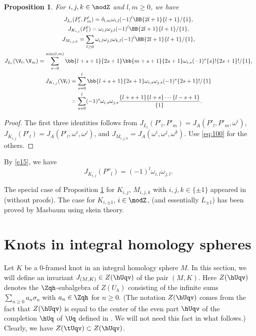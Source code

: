 \documentclass{amsart}
\numberwithin{equation}{section}
\numberwithin{figure}{section}
\theoremstyle{plain}
\newtheorem{proposition}[theorem]{Proposition}
\theoremstyle{definition}
\theoremstyle{remark}
\begin{document}
\begin{proposition}
  \label{r3}
  For $i,j,k\in \modZ $ and $l,m\ge 0$, we have
  \begin{gather}
    \label{e5}
    J_{L_i}(P'_l,P'_m)
    =\delta _{l,m}\omega _{i,l}(-1)^l{\BB{2l+1}{l+1}}/{\{1\}},\\
    \label{e15}
    J_{K_{i,j}}(P'_l)
    =\omega _{i,l}\omega _{j,l}(-1)^l{\BB{2l+1}{l+1}}/{\{1\}},\\
    \label{e20}
    J_{M_{i,j,k}}=
    \sum_{l\ge 0}\omega _{i,l}\omega _{j,l}\omega _{k,l}(-1)^l{\BB{2l+1}{l+1}}/{\{1\}},\\
    \label{e18}
    J_{L_i}(\V_l,\V_m)
    =\sum_{s=0}^{\min(l,m)} \bb{l+s+1}{2s+1}\bb{m+s+1}{2s+1}\omega _{i,s}
    (-1)^s\{s\}!\{2s+1\}!/{\{1\}},
    \\
    \label{e19}
    \begin{split}
      J_{K_{i,j}}(\V_l)
      &=\sum_{s=0}^{l} \bb{l+s+1}{2s+1}\omega _{i,s}\omega _{j,s}
      (-1)^s\{2s+1\}!/{\{1\}}\\
      &=\sum_{s=0}^{l} (-1)^s\omega _{i,s}\omega _{j,s}
      \frac{\{l+s+1\}\{l+s\}\cdots\{l-s+1\}}{\{1\}}.
    \end{split}
  \end{gather}
\end{proposition}

\begin{proof}
  The first three identities follows from
  $J_{L_i}(P'_l,P'_m)=J_A(P'_l,P'_m,\omega ^i)$,
  $J_{K_{i,j}}(P'_l)=J_A(P'_l,\omega ^i,\omega ^j)$, and
  $J_{M_{i,j,k}}=J_A(\omega ^i,\omega ^j,\omega ^k)$.
  Use \eqref{eq:100} for the others.
\end{proof}

By \eqref{e15}, we have
\begin{equation*}
  J_{K_{i,j}}(P''_l) =(-1)^l\omega _{i,l}\omega _{j,l}.
\end{equation*}

The special case of Proposition \ref{r3} for $K_{i,j}$, $M_{i,j,k}$
with $i,j,k\in \{\pm 1\}$ appeared in \cite{H:iias2000,H:rims2001,Le2}
(without proofs).  The case for $K_{i,\pm 1}$, $i\in \modZ $, (and essentially
$L_{\pm 1}$) has been proved by Masbaum \cite{Masbaum} using skein
theory.

\section{Knots in integral homology spheres}
\label{sec15}

Let $K$ be a $0$-framed knot in an integral homology sphere $M$.  In
this section, we will define an invariant $J_{(M,K)}\in Z(\hUqv)$ of the
pair $(M,K)$.  Here $Z(\hUqv)$ denotes the $\Zqh$-subalgebra of
$Z(U_h)$ consisting of the infinite sums $\sum_{n\ge 0}a_n\sigma _n$ with
$a_n\in \Zqh$ for $n\ge 0$.  (The notation $Z(\hUqv)$ comes from the fact
that $Z(\hUqv)$ is equal to the center of the even part $\hUqv$ of the
completion $\hUq$ of $\Uq$ defined in \cite{H:uqsl2}.  We will not
need this fact in what follows.)  Clearly, we have
$Z(\tUqv)\subset Z(\hUqv)$.
\end{document}

